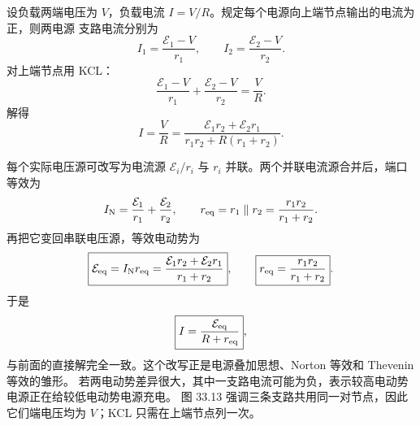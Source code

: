 \begin{xesolution}
设负载两端电压为 $V$，负载电流 $I=V/R$。规定每个电源向上端节点输出的电流为正，则两电源
支路电流分别为
\[
  I_1=\frac{\mathcal E_1-V}{r_1},
  \qquad
  I_2=\frac{\mathcal E_2-V}{r_2}.
\]
对上端节点用 KCL：
\begin{equation}
  \frac{\mathcal E_1-V}{r_1}+\frac{\mathcal E_2-V}{r_2}=\frac VR.
\end{equation}
解得
\begin{equation}
  \boxed{I=\frac VR
  =\frac{\mathcal E_1r_2+\mathcal E_2r_1}
  {r_1r_2+R(r_1+r_2)}}.
\end{equation}

每个实际电压源可改写为电流源 $\mathcal E_i/r_i$ 与 $r_i$ 并联。两个并联电流源合并后，端口
等效为
\begin{equation}
  I_{\rm N}=\frac{\mathcal E_1}{r_1}+\frac{\mathcal E_2}{r_2},
  \qquad
  r_{\rm eq}=r_1\parallel r_2=\frac{r_1r_2}{r_1+r_2}.
\end{equation}
再把它变回串联电压源，等效电动势为
\begin{equation}
  \boxed{\mathcal E_{\rm eq}=I_{\rm N}r_{\rm eq}
  =\frac{\mathcal E_1r_2+\mathcal E_2r_1}{r_1+r_2}},
  \qquad
  \boxed{r_{\rm eq}=\frac{r_1r_2}{r_1+r_2}}.
\end{equation}
于是
\begin{equation}
  \boxed{I=\frac{\mathcal E_{\rm eq}}{R+r_{\rm eq}}},
\end{equation}
与前面的直接解完全一致。这个改写正是电源叠加思想、Norton 等效和 Thevenin 等效的雏形。
若两电动势差异很大，其中一支路电流可能为负，表示较高电动势电源正在给较低电动势电源充电。
图 33.13 强调三条支路共用同一对节点，因此它们端电压均为 $V$；KCL 只需在上端节点列一次。

\dualSourceDiagram
\end{xesolution}
